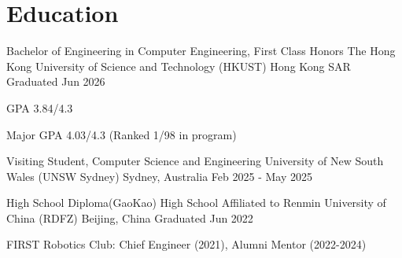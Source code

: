 \vspace{-\acvSectionTopSkip}
\section{Education}
\cventry
{Bachelor of Engineering in Computer Engineering, First Class Honors} %
{The Hong Kong University of Science and Technology (HKUST)} %
{Hong Kong SAR} %
{Graduated Jun 2026} %
\begin{cvitems}
    \item {GPA 3.84/4.3}
    \item {Major GPA 4.03/4.3 (Ranked 1/98 in program)}
\end{cvitems}

\cventry
{Visiting Student, Computer Science and Engineering} %
{University of New South Wales (UNSW Sydney)} %
{Sydney, Australia} %
{Feb 2025 - May 2025} %

\cventry
{High School Diploma(GaoKao)} %
{High School Affiliated to Renmin University of China (RDFZ)} %
{Beijing, China} %
{Graduated Jun 2022} %
\begin{cvitems}
\item {FIRST Robotics Club: Chief Engineer (2021), Alumni Mentor (2022-2024)}
\end{cvitems}
